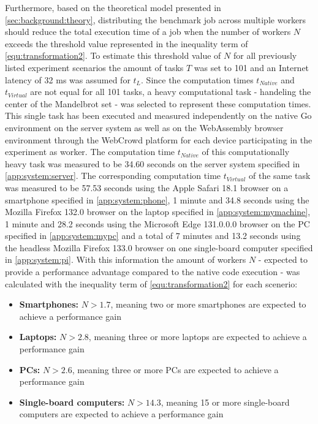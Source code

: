 Furthermore, based on the theoretical model presented in \autoref{sec:background:theory}, distributing the benchmark job across multiple workers should reduce the total execution time of a job when the number of workers $N$ exceeds the threshold value represented in the inequality term of \eqref{equ:transformation2}. To estimate this threshold value of $N$ for all previously listed experiment scenarios the amount of tasks $T$ was set to 101 and an Internet latency of 32 ms \cite{backend:latency} was assumed for $t_{L}$. Since the computation times $t_{Native}$ and $t_{Virtual}$ are not equal for all 101 tasks, a heavy computational task - handeling the center of the Mandelbrot set - was selected to represent these computation times. This single task has been executed and measured independently on the native Go environment on the server system as well as on the WebAssembly browser environment through the WebCrowd platform for each device participating in the experiment as worker. The computation time $t_{Native}$ of this computationally heavy task was measured to be 34.60 seconds on the server system specified in \autoref{app:system:server}. The corresponding computation time $t_{Virtual}$ of the same task was measured to be 57.53 seconds using the Apple Safari 18.1 \cite{evaluation:safari} browser on a smartphone specified in \autoref{app:system:phone}, 1 minute and 34.8 seconds using the Mozilla Firefox 132.0 \cite{background:firefox} browser on the laptop specified in \autoref{app:system:mymachine}, 1 minute and 28.2 seconds using the Microsoft Edge 131.0.0.0 \cite{evaluation:edge} browser on the \acs{PC} specified in \autoref{app:system:mypc} and a total of 7 minutes and 13.2 seconds using the headless Mozilla Firefox 133.0 \cite{background:firefox2} browser on one single-board computer specified in \autoref{app:system:pi}. With this information the amount of workers $N$ - expected to provide a performance advantage compared to the native code execution - was calculated with the inequality term of \eqref{equ:transformation2} for each scenerio:
\begin{itemize}
    \item \textbf{Smartphones:} $N > 1.7$, meaning two or more smartphones are expected to achieve a performance gain 
    \item \textbf{Laptops:} $N > 2.8$, meaning three or more laptops are expected to achieve a performance gain
    \item \textbf{PCs:} $N > 2.6$, meaning three or more \acs{PC}s are expected to achieve a performance gain
    \item \textbf{Single-board computers:} $N > 14.3$, meaning 15 or more single-board computers are expected to achieve a performance gain
\end{itemize}

